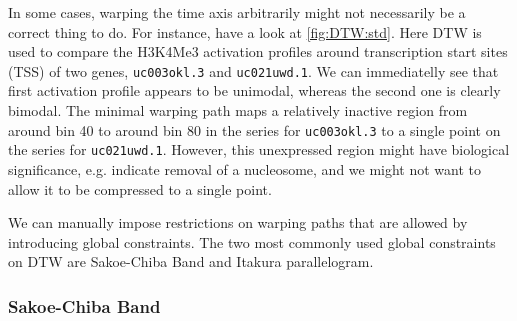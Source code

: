 \documentclass[parskip]{cs4rep}
\newcommand{\gene}[1]{{\tt #1}}
\newcommand{\histonemodification}[1]{#1}
\begin{document}
In some cases, warping the time axis arbitrarily might not necessarily be a correct thing to do.
For instance, have a look at \autoref{fig:DTW:std}. Here DTW is used to compare the \histonemodification{H3K4Me3} activation profiles around transcription start sites (TSS) of two genes, \gene{uc003okl.3} and \gene{uc021uwd.1}. We can immediatelly see that first activation profile appears to be unimodal, whereas the second one is clearly bimodal. The minimal warping path maps a relatively inactive region from around bin 40 to around bin 80 in the series for \gene{uc003okl.3} to a single point on the series for \gene{uc021uwd.1}. However, this unexpressed region might have biological significance, e.g. indicate removal of a nucleosome, and we might not want to allow it to be compressed to a single point. 

We can manually impose restrictions on warping paths that are allowed by introducing global constraints. The two most commonly used global constraints on DTW are Sakoe-Chiba Band and Itakura parallelogram\citep{Ratanamahatana:2004wu}.

\subsubsection{Sakoe-Chiba Band}
\end{document}
